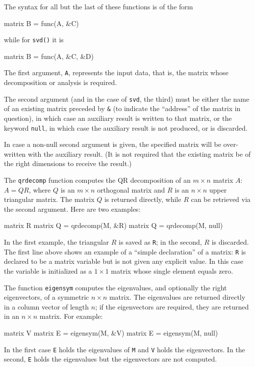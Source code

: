 The syntax for all but the last of these functions is of the form
%
\begin{code}
matrix B = func(A, &C)
\end{code}
%
while for \texttt{svd()} it is
%
\begin{code}
matrix B = func(A, &C, &D)
\end{code}
%
The first argument, \texttt{A}, represents the input data, that is,
the matrix whose decomposition or analysis is required.

The second argument (and in the case of \texttt{svd}, the third) must
be either the name of an existing matrix preceded by \verb+&+ (to
indicate the ``address'' of the matrix in question), in which case an
auxiliary result is written to that matrix, or the keyword
\texttt{null}, in which case the auxiliary result is not produced, or
is discarded.

In case a non-null second argument is given, the specified matrix will
be over-written with the auxiliary result.  (It is not required that
the existing matrix be of the right dimensions to receive the result.)

The \texttt{qrdecomp} function computes the QR decomposition of an $m
\times n$ matrix $A$: $A = QR$, where $Q$ is an $m \times n$
orthogonal matrix and $R$ is an $n \times n$ upper triangular matrix.
The matrix $Q$ is returned directly, while $R$ can be retrieved via
the second argument.  Here are two examples:
%
\begin{code}
matrix R
matrix Q = qrdecomp(M, &R)
matrix Q = qrdecomp(M, null)
\end{code}
%
In the first example, the triangular $R$ is saved as \texttt{R}; in
the second, $R$ is discarded.  The first line above shows an example
of a ``simple declaration'' of a matrix: \texttt{R} is
declared to be a matrix variable but is not given any explicit value.
In this case the variable is initialized as a $1\times 1$ matrix whose
single element equals zero.

The function \texttt{eigensym} computes the eigenvalues, and
optionally the right eigenvectors, of a symmetric $n \times n$ matrix.
The eigenvalues are returned directly in a column vector of length
$n$; if the eigenvectors are required, they are returned in an $n
\times n$ matrix.  For example:
%
\begin{code}
matrix V
matrix E = eigensym(M, &V)
matrix E = eigensym(M, null)
\end{code}
%
In the first case \texttt{E} holds the eigenvalues of \texttt{M} and
\texttt{V} holds the eigenvectors.  In the second, \texttt{E} holds
the eigenvalues but the eigenvectors are not computed.

